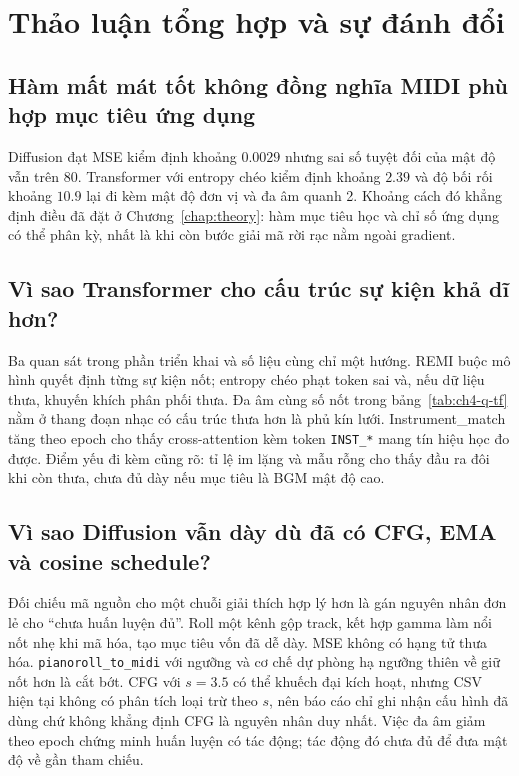 \section{Thảo luận tổng hợp và sự đánh đổi}
\label{sec:ch4-discussion}

\subsection{Hàm mất mát tốt không đồng nghĩa MIDI phù hợp mục tiêu ứng dụng}

Diffusion đạt MSE kiểm định khoảng $0.0029$ nhưng sai số tuyệt đối của mật độ vẫn trên 80. Transformer với entropy chéo kiểm định khoảng $2.39$ và độ bối rối khoảng $10.9$ lại đi kèm mật độ đơn vị và đa âm quanh 2. Khoảng cách đó khẳng định điều đã đặt ở Chương~\ref{chap:theory}: hàm mục tiêu học và chỉ số ứng dụng có thể phân kỳ, nhất là khi còn bước giải mã rời rạc nằm ngoài gradient.

\subsection{Vì sao Transformer cho cấu trúc sự kiện khả dĩ hơn?}

Ba quan sát trong phần triển khai và số liệu cùng chỉ một hướng. REMI buộc mô hình quyết định từng sự kiện nốt; entropy chéo phạt token sai và, nếu dữ liệu thưa, khuyến khích phân phối thưa. Đa âm cùng số nốt trong bảng~\ref{tab:ch4-q-tf} nằm ở thang đoạn nhạc có cấu trúc thưa hơn là phủ kín lưới. Instrument\_match tăng theo epoch cho thấy cross-attention kèm token \texttt{INST\_*} mang tín hiệu học đo được. Điểm yếu đi kèm cũng rõ: tỉ lệ im lặng và mẫu rỗng cho thấy đầu ra đôi khi còn thưa, chưa đủ dày nếu mục tiêu là BGM mật độ cao.

\subsection{Vì sao Diffusion vẫn dày dù đã có CFG, EMA và cosine schedule?}

Đối chiếu mã nguồn cho một chuỗi giải thích hợp lý hơn là gán nguyên nhân đơn lẻ cho ``chưa huấn luyện đủ''. Roll một kênh gộp track, kết hợp gamma làm nổi nốt nhẹ khi mã hóa, tạo mục tiêu vốn đã dễ dày. MSE không có hạng tử thưa hóa. \texttt{pianoroll\_to\_midi} với ngưỡng và cơ chế dự phòng hạ ngưỡng thiên về giữ nốt hơn là cắt bớt. CFG với $s=3.5$ có thể khuếch đại kích hoạt, nhưng CSV hiện tại không có phân tích loại trừ theo $s$, nên báo cáo chỉ ghi nhận cấu hình đã dùng chứ không khẳng định CFG là nguyên nhân duy nhất. Việc đa âm giảm theo epoch chứng minh huấn luyện có tác động; tác động đó chưa đủ để đưa mật độ về gần tham chiếu.


